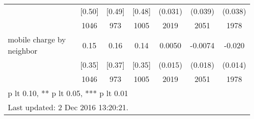 \begin{table}[htbp]
\begin{tabular*}{1\hsize}{@{\hskip\tabcolsep\extracolsep\fill}l*{1}{cccccc}}
                                &   [0.50]&   [0.49]&   [0.48]&  (0.031)         &  (0.039)         &  (0.038)         \\
                                &     1046&      973&     1005&     2019         &     2051         &     1978         \\
mobile charge by neighbor       &     0.15&     0.16&     0.14&   0.0050         &  -0.0074         &   -0.020         \\
                                &   [0.35]&   [0.37]&   [0.35]&  (0.015)         &  (0.018)         &  (0.014)         \\
                                &     1046&      973&     1005&     2019         &     2051         &     1978         \\
\bottomrule
\multicolumn{7}{l}{\footnotesize * p lt 0.10, ** p lt 0.05, *** p lt 0.01}\\
\multicolumn{7}{l}{\footnotesize Last updated:  2 Dec 2016 13:20:21.}\\
\end{tabular*}
\end{table}
